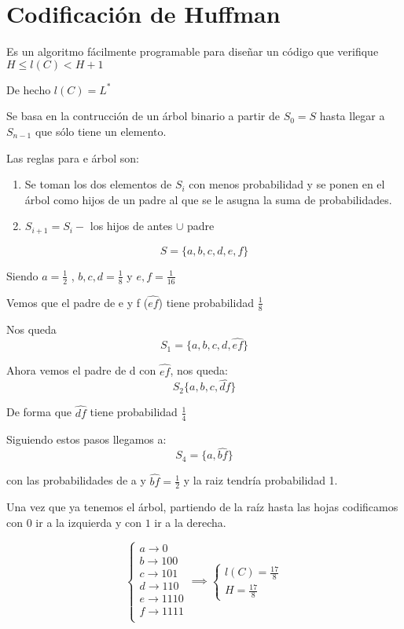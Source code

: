 \section{Codificación de Huffman}

Es un algoritmo fácilmente programable para diseñar un código que verifique $H \leq l(C) < H +1$

De hecho $l(C) = L^{*}$

Se basa en la contrucción de un árbol binario a partir de $S_0 = S$ hasta llegar a $S_{n-1}$ que sólo tiene un elemento.

Las reglas para e árbol son:
\begin{enumerate}
	\item Se toman los dos elementos de $S_i$ con menos probabilidad y se ponen en el árbol como hijos de un padre al que se le asugna la suma de probabilidades.
	\item $S_{i+1} = S_i - $ {los hijos de antes} $\cup$ {padre}
\end{enumerate}
\begin{example}
	$$S =\{ a, b , c, d, e , f \}$$
	
	Siendo $a = \frac{1}{2}$ , $b, c,d = \frac{1}{8}$ y $e, f = \frac{1}{16}$
	
	Vemos que el padre de e y f ($\widehat{ef}$) tiene probabilidad $\frac{1}{8}$
	
	Nos queda
	$$S_1 = \{a,b,c,d,\widehat{ef}\}$$
	
	
	Ahora vemos el padre de d con $\widehat{ef}$, nos queda:
	$$S_2\{ a, b,c,\widehat{df}\}$$
	
	De forma que $\widehat{df}$ tiene probabilidad $\frac{1}{4}$
	
	Siguiendo estos pasos llegamos a:
	$$S_4 = \{ a , \widehat{bf}\}$$
	
	con las probabilidades de a y $\widehat{bf} = \frac{1}{2}$ y la raiz tendría probabilidad 1.
	
	Una vez que ya tenemos el árbol, partiendo de la raíz hasta las hojas codificamos con $0$ ir a la izquierda y con $1$ ir a la derecha.
	
	$$\begin{cases}
	a \rightarrow 0 \\
	b \rightarrow 100 \\
	c \rightarrow 101 \\
	d \rightarrow 110 \\
	e \rightarrow 1110 \\
	f \rightarrow 1111 \\
	\end{cases} \implies \begin{cases}
	l(C) = \frac{17}{8}\\
	H = \frac{17}{8}
	\end{cases}$$ 
\end{example}

